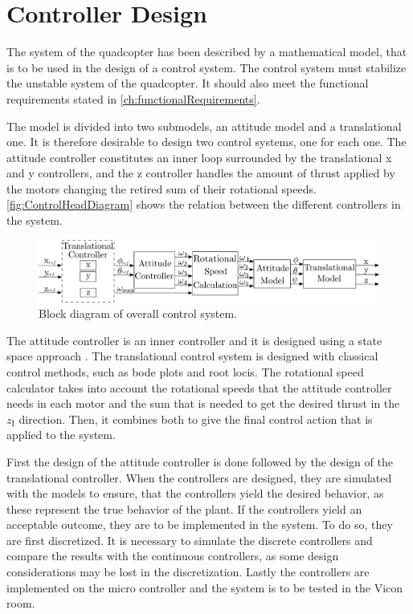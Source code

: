 \chapter{Controller Design}\label{chap:Control}
The system of the quadcopter has been described by a mathematical model, that is to be used in the design of a control system. The control system must stabilize the unstable system of the quadcopter. It should also meet the functional requirements stated in \autoref{ch:functionalRequirements}.

The model is divided into two submodels, an attitude model and a translational one. It is therefore desirable to design two control systems, one for each one. The attitude controller constitutes an inner loop surrounded by the translational x and y controllers, and the z controller handles the amount of thrust applied by the motors changing the retired sum of their rotational speeds. \autoref{fig:ControlHeadDiagram} shows the relation between the different controllers in the system.
%
\begin{figure}[H]
	\centering
	\includegraphics[width=1 \textwidth]{figures/generalcontroldiagram}
	\caption{Block diagram of overall control system.}
	\label{fig:ControlHeadDiagram}
\end{figure}

The attitude controller is an inner controller and it is designed using a state space approach  \cite{ssReference}. The translational control system is designed with classical control methods, such as bode plots and root locis. The rotational speed calculator takes into account the rotational speeds that the attitude controller needs in each motor and the sum that is needed to get the desired thrust in the $z_\mathrm{I}$ direction. Then, it combines both to give the final control action that is applied to the system.

First the design of the attitude controller is done followed by the design of the translational controller. When the controllers are designed, they are simulated with the models to ensure, that the controllers yield the desired behavior, as these represent the true behavior of the plant. If the controllers yield an acceptable outcome, they are to be implemented in the system. To do so, they are first discretized. It is necessary to simulate the discrete controllers and compare the results with the continuous controllers, as some design considerations may be lost in the discretization. Lastly the controllers are implemented on the micro controller and the system is to be tested in the Vicon room. 